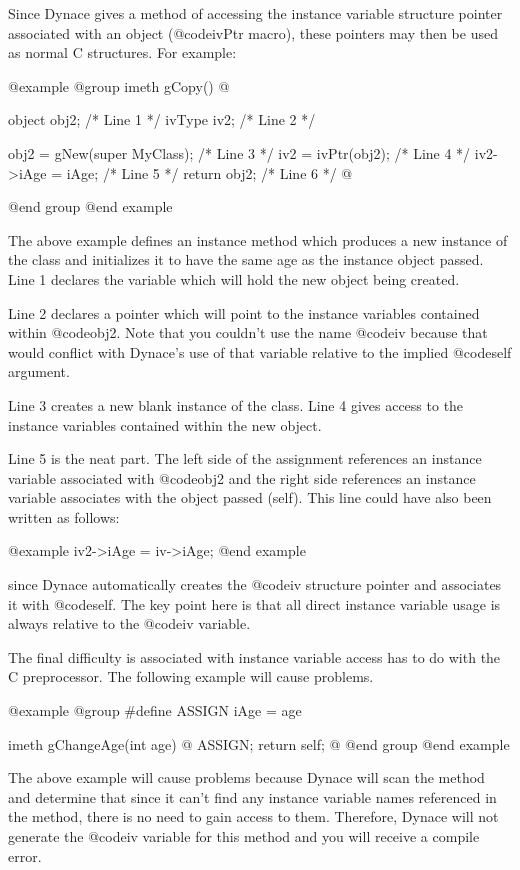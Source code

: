 Since Dynace gives a method of accessing the instance variable
structure pointer associated with an object (@code{ivPtr} macro), these
pointers may then be used as normal C structures.  For example:

@example
@group
imeth   gCopy()
@{
        object  obj2;                   /*  Line 1  */
        ivType  iv2;                    /*  Line 2  */

        obj2 = gNew(super MyClass);     /*  Line 3  */
        iv2  = ivPtr(obj2);             /*  Line 4  */
        iv2->iAge = iAge;               /*  Line 5  */
        return obj2;                    /*  Line 6  */
@}
@end group
@end example

The above example defines an instance method which produces a new
instance of the class and initializes it to have the same age as
the instance object passed.  Line 1 declares the variable which will hold
the new object being created.

Line 2 declares a pointer which will point to the instance variables contained
within @code{obj2}.  Note that you couldn't use the name @code{iv} because
that would conflict with Dynace's use of that variable relative to the
implied @code{self} argument.

Line 3 creates a new blank instance of the class.  Line 4 gives access
to the instance variables contained within the new object.

Line 5 is the neat part.  The left side of the assignment references
an instance variable associated with @code{obj2} and the right side
references an instance variable associates with the object passed
(self).  This line could have also been written as follows:

@example
        iv2->iAge = iv->iAge;
@end example

since Dynace automatically creates the @code{iv} structure pointer and
associates it with @code{self}.  The key point here is that
all direct instance variable usage is always relative to the @code{iv}
variable.

The final difficulty is associated with instance variable access has to do
with the C preprocessor.  The following example will cause problems.

@example
@group
#define ASSIGN  iAge = age

imeth   gChangeAge(int age)
@{
        ASSIGN;
        return self;
@}
@end group
@end example

The above example will cause problems because Dynace will scan the
method and determine that since it can't find any instance variable
names referenced in the method, there is no need to gain access to them.
Therefore, Dynace will not generate the @code{iv} variable for this
method and you will receive a compile error.

